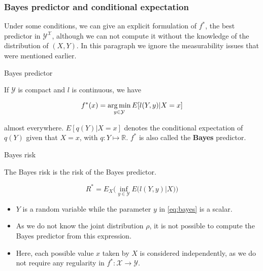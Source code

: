 \documentclass[
10pt, %
a4paper, %
oneside, %
headinclude,footinclude, %
BCOR5mm, %
]{scrartcl}
\begin{document}
    \subsubsection{\large\color{Periwinkle}Bayes predictor and conditional expectation}

    Under some conditions, we can give an explicit formulation of $f^*$, the best predictor in $ \mathcal{Y}^{ \mathcal{X} }$, although we can not compute it without the knowledge of the distribution of $(X,Y)$. In this paragraph we ignore the measurability issues that were mentioned earlier.

    \begin{theorem}{Bayes predictor}
        
	If $ \mathcal{Y} $ is compact and $l$ is continuous, we have

	\begin{equation}
	    \label{eq:bayes}
	    f^*(x) = \operatorname*{arg\,min}_{y\in \mathcal{Y} }E[ l(Y, y)|X=x]
	\end{equation}

	almost everywhere. $E[q(Y)|X=x]$ denotes the conditional expectation of $q(Y)$ given that $X=x$, with $ q:Y\mapsto \mathbb{R} $. $f^*$ is also called the \textbf{{Bayes}} predictor.
    \end{theorem}

    \begin{definition}{Bayes risk}

	The Bayes risk is the risk of the Bayes predictor.

	\begin{equation*}
	    R^* = E_X\Big( \inf_{y\in \mathcal{Y} }E\big( l(Y, y)|X\big) \Big)
	\end{equation*}
    \end{definition}


    \begin{remark}
	\begin{itemize}
	    \item $Y$ is a random variable while the parameter $y$ in \ref{eq:bayes} is a scalar.
	    \item As we do not know the joint distribution $\rho$, it is not possible to compute the Bayes predictor from this expression.
	    \item Here, each possible value $x$  taken by $X$ is considered independently, as we do not require any regularity in $f^*: \mathcal{X}\rightarrow \mathcal{Y} $.
	\end{itemize}
    \end{remark}
\end{document}
